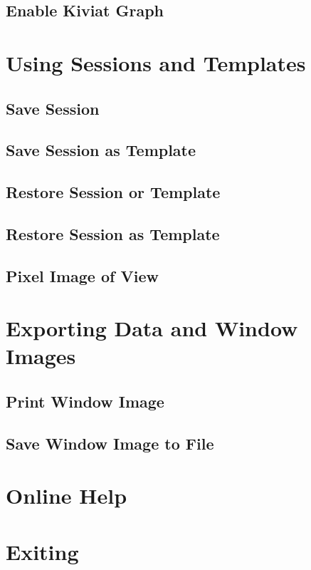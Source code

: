 \subsection{Enable Kiviat Graph}

\newpage

\section{Using Sessions and Templates}

\subsection{Save Session}
\subsection{Save Session as Template}
\subsection{Restore Session or Template}
\subsection{Restore Session as Template}
\subsection{Pixel Image of View}

\section{Exporting Data and Window Images}

\subsection{Print Window Image}

\subsection{Save Window Image to File}

\section{Online Help}

\section{Exiting \Devise}

